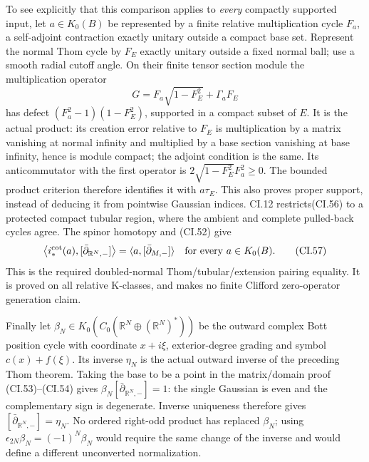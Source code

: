 \documentclass[
  11pt,
]{article}
\begin{document}
To see explicitly that this comparison applies to \emph{every} compactly
supported input, let \(a\in K_0(B)\) be represented by a finite relative
multiplication cycle \(F_a\), a self-adjoint contraction exactly unitary
outside a compact base set. Represent the normal Thom cycle by \(F_E\)
exactly unitary outside a fixed normal ball; use a smooth radial cutoff
angle. On their finite tensor section module the multiplication operator
\[
 G=F_a\sqrt{1-F_E^2}+\Gamma_a F_E
 \tag{CI.56}
\] has defect \((F_a^2-1)(1-F_E^2)\), supported in a compact subset of
\(E\). It is the actual product: its creation error relative to \(F_E\)
is multiplication by a matrix vanishing at normal infinity and
multiplied by a base section vanishing at base infinity, hence is module
compact; the adjoint condition is the same. Its anticommutator with the
first operator is \(2\sqrt{1-F_E^2}F_a^2\geq0\). The bounded product
criterion therefore identifies it with \(a\tau_E\). This also proves
proper support, instead of deducing it from pointwise Gaussian indices.
CI.12 restricts(CI.56) to a protected compact tubular region, where the
ambient and complete pulled-back cycles agree. The spinor homotopy and
(CI.52) give \[
 \bigl\langle i_*^{\rm cot}(a),[\bar\partial_{\mathbb R^N,-}]\bigr\rangle
       =\langle a,[\bar\partial_{M,-}]\rangle
                         \quad\text{for every }a\in K_0(B).
 \tag{CI.57}
\] This is the required doubled-normal Thom/tubular/extension pairing
equality. It is proved on all relative K-classes, and makes no finite
Clifford zero-operator generation claim.

Finally let \(\beta_N\in K_0(C_0(\mathbb R^N\oplus(\mathbb R^N)^*))\) be
the outward complex Bott position cycle with coordinate \(x+i\xi\),
exterior-degree grading and symbol \(c(x)+f(\xi)\). Its inverse
\(\eta_N\) is the actual outward inverse of the preceding Thom theorem.
Taking the base to be a point in the matrix/domain proof
(CI.53)--(CI.54) gives \(\beta_N[\bar\partial_{\mathbb R^N,-}]=1\): the
single Gaussian is even and the complementary sign is degenerate.
Inverse uniqueness therefore gives
\([\bar\partial_{\mathbb R^N,-}]=\eta_N\). No ordered right-odd product
has replaced \(\beta_N\); using \(\epsilon_{2N}\beta_N=(-1)^N\beta_N\)
would require the same change of the inverse and would define a
different unconverted normalization.
\end{document}

